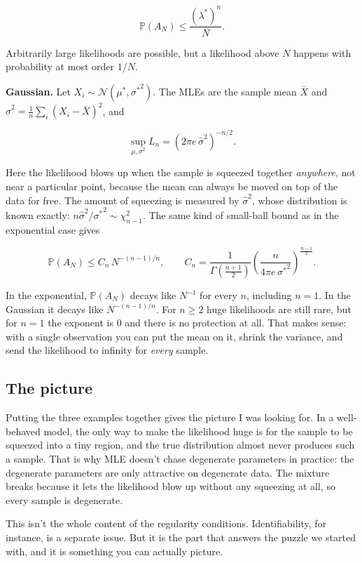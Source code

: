 \documentclass{article}
\begin{document}
\[\mathbb{P}(A_N) \le \frac{(\lambda^*)^n}{N}.\]

Arbitrarily large likelihoods are possible, but a likelihood above $N$ happens with probability at most order $1/N$.

\textbf{Gaussian.} Let $X_i \sim \mathcal{N}(\mu^*, {\sigma^*}^2)$. The MLEs are the sample mean $\bar X$ and $\hat\sigma^2 = \frac1n\sum_i (X_i - \bar X)^2$, and

\[\sup_{\mu,\sigma^2} L_n = \left(2\pi e\,\hat\sigma^2\right)^{-n/2}.\]

Here the likelihood blows up when the sample is squeezed together \emph{anywhere}, not near a particular point, because the mean can always be moved on top of the data for free. The amount of squeezing is measured by $\hat\sigma^2$, whose distribution is known exactly: $n\hat\sigma^2/{\sigma^*}^2 \sim \chi^2_{n-1}$. The same kind of small-ball bound as in the exponential case gives

\[\mathbb{P}(A_N) \le C_n \, N^{-(n-1)/n}, \qquad C_n = \frac{1}{\Gamma\left(\frac{n+1}{2}\right)}\left(\frac{n}{4\pi e\,{\sigma^*}^2}\right)^{\frac{n-1}{2}}.\]

In the exponential, $\mathbb{P}(A_N)$ decays like $N^{-1}$ for every $n$, including $n = 1$. In the Gaussian it decays like $N^{-(n-1)/n}$. For $n \ge 2$ huge likelihoods are still rare, but for $n = 1$ the exponent is $0$ and there is no protection at all. That makes sense: with a single observation you can put the mean on it, shrink the variance, and send the likelihood to infinity for \emph{every} sample.

\subsection{The picture}

Putting the three examples together gives the picture I was looking for. In a well-behaved model, the only way to make the likelihood huge is for the sample to be squeezed into a tiny region, and the true distribution almost never produces such a sample. That is why MLE doesn't chase degenerate parameters in practice: the degenerate parameters are only attractive on degenerate data. The mixture breaks because it lets the likelihood blow up without any squeezing at all, so every sample is degenerate.

This isn't the whole content of the regularity conditions. Identifiability, for instance, is a separate issue. But it is the part that answers the puzzle we started with, and it is something you can actually picture.
\end{document}
